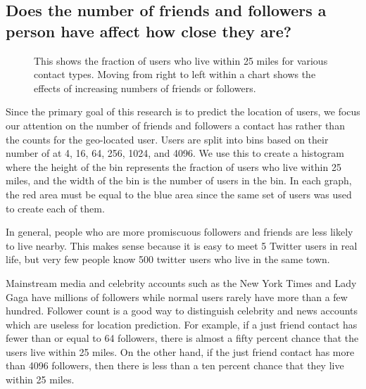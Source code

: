 \documentclass{sig-alternate}
\begin{document}
\subsection{Does the number of friends and followers a person have affect how close they are?}

\begin{figure*}
\centering
{}
\caption{
This shows the fraction of users who live within 25 miles for various contact types. Moving from right to left within a chart shows the effects of increasing numbers of friends or followers.
}
\label{fig:LocalAll}
\end{figure*}

Since the primary goal of this research is to predict the location of users, we focus our attention on the number of friends and followers a contact has rather than the counts for the geo-located user. 
Users are split into bins based on their number of at 4, 16, 64, 256, 1024, and 4096.
We use this to create a histogram where the height of the bin represents the fraction of users who live within 25 miles, and the width of the bin is the number of users in the bin.
In each graph, the red area must be equal to the blue area since the same set of users was used to create each of them.

In general, people who are more promiscuous followers and friends are less likely to live nearby. This makes sense because it is easy to meet 5 Twitter users in real life, but very few people know 500 twitter users who live in the same town.

Mainstream media and celebrity accounts such as the New York Times and Lady Gaga have millions of followers while normal users rarely have more than a few hundred.
Follower count is a good way to distinguish celebrity and news accounts which are useless for location prediction.
For example, if a just friend contact has fewer than or equal to 64 followers, there is almost a fifty percent chance that the users live within 25 miles. On the other hand, if the just friend contact has more than 4096 followers, then there is less than a ten percent chance that they live within 25 miles.
\end{document}
